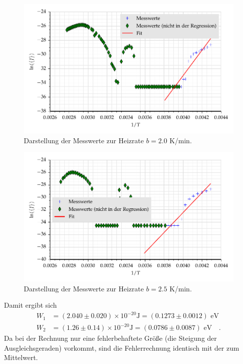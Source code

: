 \begin{figure}[h]
\centering
\includegraphics[scale=0.8]{../skript/G1.pdf}
\caption{Darstellung der Messwerte zur Heizrate $b=2.0$ K/min.}
\label{fig:G1}
\end{figure}
\begin{figure}[h]
\centering
\includegraphics[scale=0.8]{../skript/G2.pdf}
\caption{Darstellung der Messwerte zur Heizrate $b=2.5$ K/min.}
\label{fig:G2}
\end{figure}



Damit ergibt sich
\begin{align}
W_1&= (2.040 \pm 0.020)\times 10^{-20}\text{J}=(0.1273\pm0.0012)\text{ eV}\\
W_2&=  (1.26 \pm 0.14) \times 10^{-20}\text{J}=(0.0786\pm 0.0087)\text{ eV}\quad .
\end{align}
Da bei der Rechnung nur eine fehlerbehaftete Größe (die Steigung der
Ausgleichsgeraden) vorkommt, sind die Fehlerrechnung identisch mit der
zum Mittelwert.
